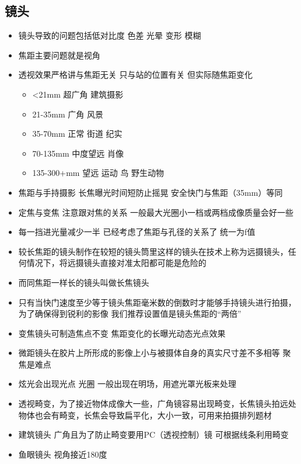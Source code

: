 \documentclass[
  letterpaper,
  DIV=11,
  numbers=noendperiod]{scrreprt}
\providecommand{\tightlist}{%
  \setlength{\itemsep}{0pt}\setlength{\parskip}{0pt}}\usepackage{longtable,booktabs,array}
\begin{document}
\subsection{镜头}\label{ux955cux5934}

\begin{itemize}
\tightlist
\item
  镜头导致的问题包括低对比度 色差 光晕 变形 模糊
\item
  焦距主要问题就是视角
\item
  透视效果严格讲与焦距无关 只与站的位置有关 但实际随焦距变化

  \begin{itemize}
  \tightlist
  \item
    \textless21mm 超广角 建筑摄影
  \item
    21-35mm 广角 风景
  \item
    35-70mm 正常 街道 纪实
  \item
    70-135mm 中度望远 肖像
  \item
    135-300+mm 望远 运动 鸟 野生动物
  \end{itemize}
\item
  焦距与手持摄影 长焦曝光时间短防止摇晃 安全快门与焦距（35mm）等同
\item
  定焦与变焦 注意跟对焦的关系 一般最大光圈小一档或两档成像质量会好一些
\item
  每一挡进光量减少一半 已经考虑了焦距与孔径的关系了 统一为f值
\item
  较长焦距的镜头制作在较短的镜头筒里这样的镜头在技术上称为远摄镜头，任何情况下，将远摄镜头直接对准太阳都可能是危险的
\item
  而同焦距一样长的镜头叫做长焦镜头
\item
  只有当快门速度至少等于镜头焦距毫米数的倒数时才能够手持镜头进行拍摄，为了确保得到锐利的影像
  我们推荐设置值是镜头焦距的``两倍''
\item
  变焦镜头可制造焦点不变 焦距变化的长曝光动态光点效果
\item
  微距镜头在胶片上所形成的影像上小与被摄体自身的真实尺寸差不多相等
  聚焦是难点
\item
  炫光会出现光点 光圈 一般出现在明场，用遮光罩光板来处理
\item
  透视畸变，为了接近物体成像大一些，广角镜容易出现畸变，长焦镜头拍远处物体也会有畸变，长焦会导致扁平化，大小一致，可用来拍摄排列题材
\item
  建筑镜头 广角且为了防止畸变要用PC（透视控制）镜 可根据线条利用畸变
\item
  鱼眼镜头 视角接近180度
\end{itemize}
\end{document}
